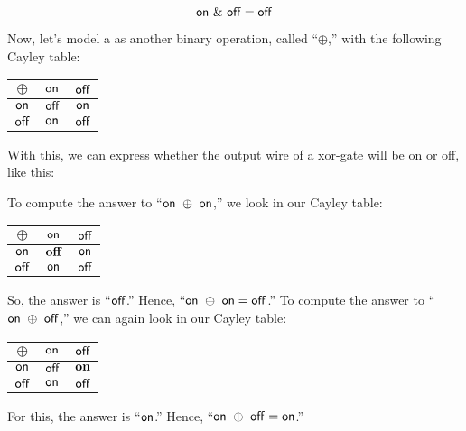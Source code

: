 \documentclass[../../../main.tex]{subfiles}
\begin{document}
\begin{equation*}
  \mathsf{on}~\&~\mathsf{off} = \mathsf{off}
\end{equation*}

Now, let's model a  as another binary operation, called ``$\oplus$,'' with the following Cayley table:

\begin{center}
  \begin{tabular}{| c || c | c |}
    \hline
    $\oplus$    & $\mathsf{on}$  & $\mathsf{off}$ \\ \hline \hline
    $\mathsf{on}$  & $\mathsf{off}$ & $\mathsf{on}$  \\ \hline
    $\mathsf{off}$ & $\mathsf{on}$  & $\mathsf{off}$ \\ \hline
  \end{tabular}
\end{center}

With this, we can express whether the output wire of a xor-gate will be on or off, like this:

\begin{aside}
  \begin{remark}
    To compute the answer to ``$\mathsf{on}~\oplus~\mathsf{on}$,'' we look in our Cayley table:
  
    \begin{center}
      \begin{tabular}{| c || c | c |}
        \hline
        $\oplus$    & \cellcolor{grey3} $\mathsf{on}$  & $\mathsf{off}$ \\ \hline \hline
        \cellcolor{grey3} $\mathsf{on}$  & \cellcolor{grey3} $\mathsf{\mathbf{off}}$ & $\mathsf{on}$  \\ \hline
        $\mathsf{off}$ & $\mathsf{on}$  & $\mathsf{off}$ \\ \hline
      \end{tabular}
    \end{center}

    So, the answer is ``$\mathsf{off}$.'' Hence, ``$\mathsf{on}~\oplus~\mathsf{on} = \mathsf{off}$.'' To compute the answer to ``$\mathsf{on}~\oplus~\mathsf{off}$,'' we can again look in our Cayley table:
    
    \begin{center}
      \begin{tabular}{| c || c | c |}
        \hline
        $\oplus$    & $\mathsf{on}$  & \cellcolor{grey3} $\mathsf{off}$ \\ \hline \hline
        \cellcolor{grey3} $\mathsf{on}$  & \cellcolor{grey3} $\mathsf{off}$ & \cellcolor{grey3} $\mathsf{\mathbf{on}}$  \\ \hline
        $\mathsf{off}$ & $\mathsf{on}$  & $\mathsf{off}$ \\ \hline
      \end{tabular}
    \end{center}
    
    For this, the answer is ``$\mathsf{on}$.'' Hence, ``$\mathsf{on}~\oplus~\mathsf{off} = \mathsf{on}$.''
  \end{remark}
\end{aside}
\end{document}
